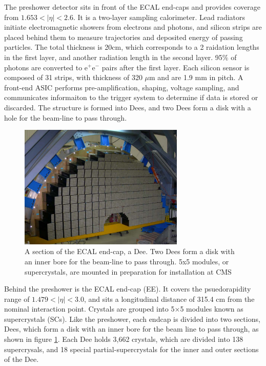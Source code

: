 \par The preshower detector sits in front of the ECAL end-caps and
provides coverage from $1.653<|\eta|<2.6$.  It is a two-layer sampling
calorimeter.  Lead radiators initiate electromagnetic showers from
electrons and photons, and silicon strips are placed behind them to
measure trajectories and deposited energy of passing particles.  The
total thickness is 20cm, which corresponds to a 2 raidation lengths in
the first layer, and another radiation length in the second layer.
95$\%$ of photons  are converted to e$^{+}$e$^{-}$ pairs after the
first layer.  Each silicon sensor is composed of 31 strips, with
thickness of 320 $\mu$m and are 1.9 mm in pitch.  A front-end ASIC
performs pre-amplification, shaping, voltage sampling, and
communicates informaiton to the trigger system to determine if data is
stored or discarded.  The structure is formed into Dees, and two Dees
form a disk with a hole for the beam-line to pass through.    

\begin{figure}[h]
   \centering
  \includegraphics[width=0.7\textwidth]{Figures/CMS_Diagrams/ECAL__EndCap_Dee.pdf}
  \caption{A section of the ECAL end-cap, a Dee.  Two Dees form a disk
  with an inner bore for the beam-line to pass through.  5x5 modules,
  or supercrystals, are mounted in preparation for installation at CMS} \label{fig:ecal_endcap_dee}
\end{figure}

\par Behind the preshower is the ECAL end-cap (EE).  It covers the
psuedorapidity range of $1.479<|\eta|<3.0$, and sits a longitudinal
distance of 315.4 cm from the nominal interaction point.  Crystals are
grouped into 5$\times$5 modules known as supercrystals (SCs).  Like
the preshower, each endcap is divided into two sections, Dees, which
form a disk with an inner bore for the beam line to pass through, as
shown in figure \ref{fig:ecal_endcap_dee}.  Each Dee holds 3,662
crystals, which are divided into 138 supercrysals, and 18 special
partial-supercrystals for the inner and outer sections of the Dee.  

